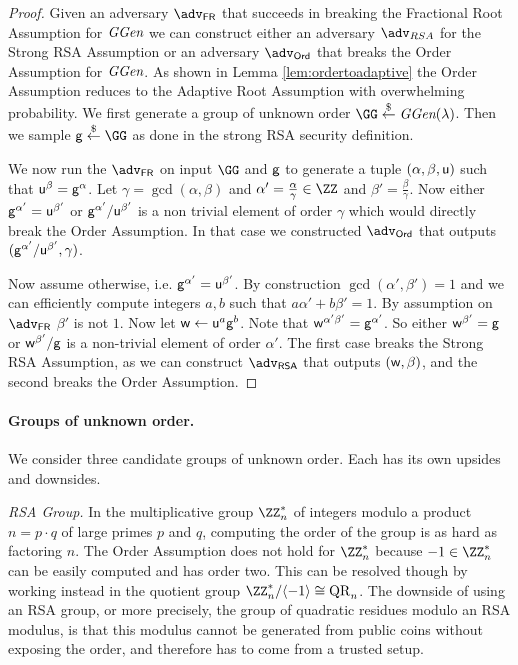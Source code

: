 \documentclass{article}
\theoremstyle{definition}
\newcommand{\alan}[1]{{\todo[color=blue!40!white]{Alan: #1}}}
\newcommand{\alan}[1]{}
\begin{document}
\begin{proof}
	Given an adversary $\adv_{\textsf{FR}}$ that succeeds in breaking the Fractional Root Assumption for $\textit{GGen}$ we can construct either an adversary $\adv_{RSA}$ for the Strong RSA Assumption or an adversary $\adv_{\textsf{Ord}}$ that breaks the Order Assumption for $\textit{GGen}$. As shown in Lemma \ref{lem:ordertoadaptive} the Order Assumption reduces to the Adaptive Root Assumption with overwhelming probability. 
	We first generate a group of unknown order $\GG \sample \ggen(\lambda)$.
	Then we sample $\gr{g}\sample \GG$ as done in the strong \textsf{RSA} security definition.
	
	We now run the $\adv_{\textsf{FR}}$ on input $\GG$ and $\mathsf{g}$ to generate a tuple $(\alpha,\beta,\mathsf{u})$ such that $\mathsf{u}^{\beta}=\mathsf{g}^{\alpha}$. Let $\gamma=\gcd(\alpha,\beta)$ and $\alpha'=\frac{\alpha}{\gamma}\in \ZZ$ and  $\beta'=\frac{\beta}{\gamma}$. Now either $\mathsf{g}^{\alpha'}=\mathsf{u}^{\beta'}$ or $\mathsf{g}^{\alpha'}/\mathsf{u}^{\beta'}$ is a non trivial element of order $\gamma$ which would directly break the Order Assumption. In that case we constructed $\adv_{\textsf{Ord}}$ that outputs $(\mathsf{g}^{\alpha'}/\mathsf{u}^{\beta'},\gamma)$.
	
	Now assume otherwise, i.e. $\mathsf{g}^{\alpha'}=\mathsf{u}^{\beta'}$. By construction $\gcd(\alpha',\beta')=1$ and we can efficiently compute integers $a,b$ such that $a \alpha'+b \beta'=1$. By assumption on $\adv_{\textsf{FR}}$ $\beta'$ is not $1$. Now let $\mathsf{w}\gets \mathsf{u}^{a}\mathsf{g}^{b}$. Note that $\mathsf{w}^{\alpha'\beta'}=\mathsf{g}^{\alpha'}$. So either $\mathsf{w}^{\beta'}=\mathsf{g}$ or $\mathsf{w}^{\beta'}/\mathsf{g}$ is a non-trivial element of order $\alpha'$. The first case breaks the Strong RSA Assumption, as we can construct $\adv_{\textsf{RSA}}$ that outputs $(\mathsf{w},\beta)$, and the second breaks the Order Assumption.
\end{proof}

\paragraph{Groups of unknown order.}
We consider three candidate groups of unknown order. Each has its own upsides and downsides.

\textit{RSA Group.} In the multiplicative group $\ZZ_n^*$ of integers modulo a product $n=p\cdot q$ of large primes $p$ and $q$, computing the order of the group is as hard as factoring $n$. The Order Assumption does not hold for $\ZZ_n^*$ because $-1 \in \ZZ_n^*$ can be easily computed and has order two. This can be resolved though by working instead in the quotient group $\ZZ_n^* / \langle-1\rangle \cong \mathrm{QR}_n$. %
The downside of using an RSA group, or more precisely, the group of quadratic residues modulo an RSA modulus, is that this modulus cannot be generated from public coins without exposing the order, and therefore has to come from a trusted setup.
\end{document}
